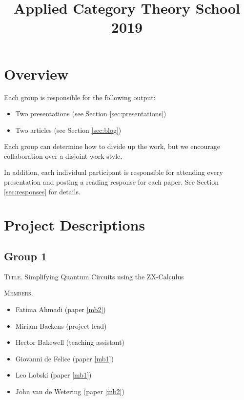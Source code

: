 \documentclass[11pt, oneside]{article}
\title{Applied Category Theory School 2019}
\author{}
\date{}
\begin{document}
\maketitle
\tableofcontents

\pagebreak

\section{Overview}
\label{sec:overview}

Each group is responsible for the following output:
\begin{itemize}
\item Two presentations (see Section \ref{sec:presentations})
\item Two articles (see Section \ref{sec:blog})
\end{itemize}
Each group can determine how to divide up the work, but we
encourage collaboration over a disjoint work style.  

In addition, each individual participant is responsible for
attending every presentation and posting a reading response
for each paper. See Section \ref{sec:responses} for details.

\pagebreak

\section{Project Descriptions}
\label{sec:projects}

%
%

\subsection*{Group 1}

\textsc{Title.}
Simplifying Quantum Circuits using the ZX-Calculus

\textsc{Members.}
\begin{multicols}{2}
  \begin{itemize}
  \item Fatima Ahmadi (paper \ref{mb2})
  \item Miriam Backens (project lead)
  \item Hector Bakewell (teaching assistant)
  \item Giovanni de Felice (paper \ref{mb1})
  \item Leo Lobski (paper \ref{mb1})
  \item John van de Wetering (paper \ref{mb2})
  \end{itemize}
\end{multicols}
\end{document}
